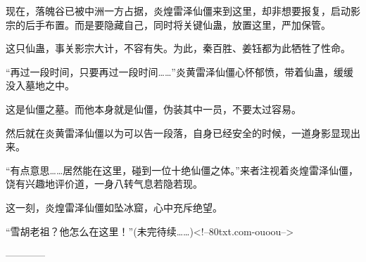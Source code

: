 \begin{this_body}
现在，落魄谷已被中洲一方占据，炎煌雷泽仙僵来到这里，却非想要报复，启动影宗的后手布置。而是要隐藏自己，同时将关键仙蛊，放置这里，严加保管。

这只仙蛊，事关影宗大计，不容有失。为此，秦百胜、姜钰都为此牺牲了性命。

“再过一段时间，只要再过一段时间……”炎黄雷泽仙僵心怀郁愤，带着仙蛊，缓缓没入墓地之中。

这是仙僵之墓。而他本身就是仙僵，伪装其中一员，不要太过容易。

然后就在炎黄雷泽仙僵以为可以告一段落，自身已经安全的时候，一道身影显现出来。

“有点意思……居然能在这里，碰到一位十绝仙僵之体。”来者注视着炎煌雷泽仙僵，饶有兴趣地评价道，一身八转气息若隐若现。

这一刻，炎煌雷泽仙僵如坠冰窟，心中充斥绝望。

“雪胡老祖？他怎么在这里！”(未完待续……)<!--80txt.com-ouoou-->

------------

\end{this_body}

